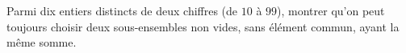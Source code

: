 Parmi dix entiers distincts de deux chiffres (de $10$ à $99$), montrer qu'on
peut toujours choisir deux sous-ensembles non vides, sans élément commun,
ayant la même somme.
